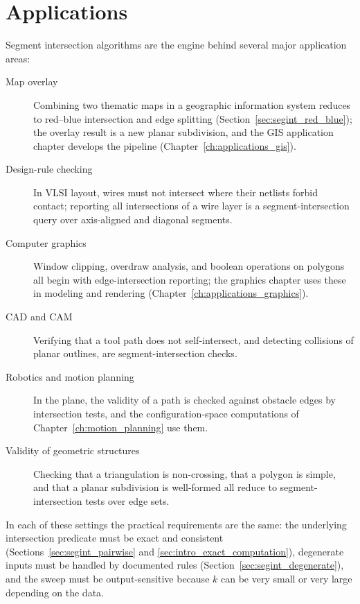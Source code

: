 \section{Applications}
\label{sec:segint_applications}

Segment intersection algorithms are the engine behind several major
application areas:

\begin{description}
  \item[Map overlay] Combining two thematic maps in a geographic
    information system reduces to red--blue intersection and edge splitting
    (Section~\ref{sec:segint_red_blue}); the overlay result is a new planar
    subdivision, and the GIS application chapter develops the pipeline
    (Chapter~\ref{ch:applications_gis}).
  \item[Design-rule checking] In VLSI layout, wires must not intersect
    where their netlists forbid contact; reporting all intersections of a
    wire layer is a segment-intersection query over axis-aligned and
    diagonal segments.
  \item[Computer graphics] Window clipping, overdraw analysis, and boolean
    operations on polygons all begin with edge-intersection reporting; the
    graphics chapter uses these in modeling and rendering
    (Chapter~\ref{ch:applications_graphics}).
  \item[CAD and CAM] Verifying that a tool path does not self-intersect,
    and detecting collisions of planar outlines, are segment-intersection
    checks.
  \item[Robotics and motion planning] In the plane, the validity of a path
    is checked against obstacle edges by intersection tests, and the
    configuration-space computations of Chapter~\ref{ch:motion_planning}
    use them.
  \item[Validity of geometric structures] Checking that a triangulation is
    non-crossing, that a polygon is simple, and that a planar subdivision
    is well-formed all reduce to segment-intersection tests over edge sets.
\end{description}

In each of these settings the practical requirements are the same: the
underlying intersection predicate must be exact and consistent
(Sections~\ref{sec:segint_pairwise} and \ref{sec:intro_exact_computation}),
degenerate inputs must be handled by documented rules
(Section~\ref{sec:segint_degenerate}), and the sweep must be
output-sensitive because $k$ can be very small or very large depending on
the data.

